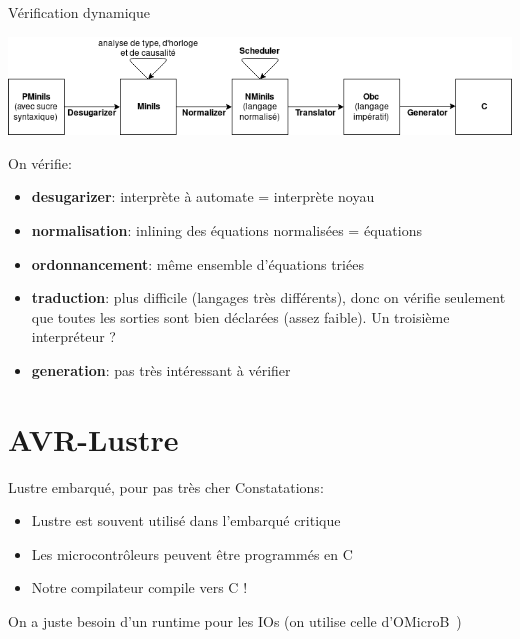 \documentclass[xcolor={svgnames}]{beamer}
\begin{document}
\begin{frame}{Vérification dynamique}
  \begin{center}
    \includegraphics[width=.8\paperwidth]{assets/chain.png}
  \end{center}
  On vérifie:
  \begin{itemize}
    \item \textbf{desugarizer}: interprète à automate = interprète noyau
    \item \textbf{normalisation}: inlining des équations normalisées = équations
    \item \textbf{ordonnancement}: même ensemble d'équations triées
    \item \textbf{traduction}: plus difficile (langages très différents), donc on vérifie seulement que toutes les sorties sont bien déclarées (assez faible). Un troisième interpréteur ?
    \item \textbf{generation}: pas très intéressant à vérifier
  \end{itemize}
\end{frame}

\section{AVR-Lustre}

\begin{frame}{Lustre embarqué, pour pas très cher}
  Constatations:
  \begin{itemize}
    \item Lustre est souvent utilisé dans l'embarqué critique
    \item Les microcontrôleurs peuvent être programmés en C
    \item Notre compilateur compile vers C !
  \end{itemize}

  On a juste besoin d'un runtime pour les IOs (on utilise celle d'OMicroB~\citep{VVC18})
\end{frame}
\end{document}

